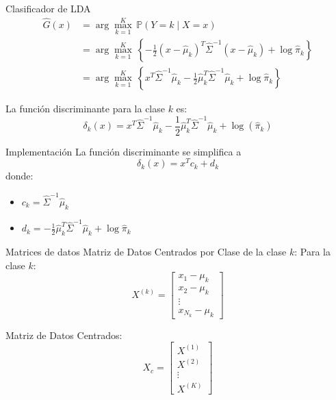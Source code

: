 \documentclass[spanish]{beamer}
\begin{document}
\begin{frame}{Clasificador de LDA}
\begin{align*}
\hat{G}(x) &= \arg\max_{k=1}^K \, \mathbb{P}(Y = k \mid X = x) \nonumber \\
&= \arg\max_{k=1}^K \, \left\{-\frac{1}{2}(x - \hat{\mu}_k)^T \hat{\Sigma}^{-1} (x - \hat{\mu}_k) + \log \hat{\pi}_k\right\} \label{eq:mahalanobis} \\
&= \arg\max_{k=1}^K \, \left\{x^T \hat{\Sigma}^{-1} \hat{\mu}_k - \frac{1}{2}\hat{\mu}_k^T \hat{\Sigma}^{-1} \hat{\mu}_k + \log \hat{\pi}_k\right\} \nonumber
\end{align*}

\begin{definition}
La función discriminante para la clase $k$ es:
\[
\delta_k(x) = x^T \hat{\Sigma}^{-1} \hat{\mu}_k - \frac{1}{2} \hat{\mu}_k^T \hat{\Sigma}^{-1} \hat{\mu}_k + \log(\hat{\pi}_k)
\]
\end{definition}
\end{frame}


\begin{frame}{Implementación}
La función discriminante se simplifica a
\[
\delta_k(x) = x^T c_k + d_k
\]
donde:
\begin{itemize}
    \item $c_k = \hat{\Sigma}^{-1} \hat{\mu}_k$
    \item $d_k = -\frac{1}{2} \hat{\mu}_k^T \hat{\Sigma}^{-1} \hat{\mu}_k + \log \hat{\pi}_k$
\end{itemize}
\end{frame}

\begin{frame}{Matrices de datos}
Matriz de Datos Centrados por Clase de la clase $k$:
Para la clase $k$:
\[
X^{(k)} = \begin{bmatrix}
x_{1} - \mu_{k} \\
x_{2} - \mu_{k}  \\
\vdots \\
x_{N_{k}} - \mu_{k}
\end{bmatrix}
\]

Matriz de Datos Centrados:
\[
X_c = \begin{bmatrix}
X^{(1)} \\ X^{(2)} \\ \vdots \\ X^{(K)}
\end{bmatrix}
\]

\end{frame}
\end{document}
